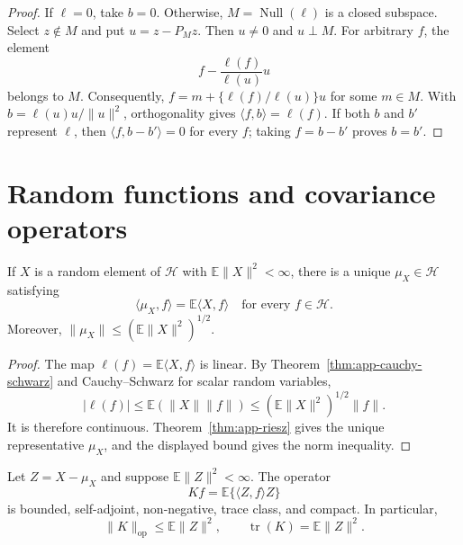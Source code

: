 \begin{proof}
If $\ell=0$, take $b=0$.  Otherwise, $M=\operatorname{Null}(\ell)$ is a
closed subspace.  Select $z\notin M$ and put $u=z-P_Mz$.  Then $u\neq0$ and
$u\perp M$.  For arbitrary $f$, the element
\[
    f-\frac{\ell(f)}{\ell(u)}u
\]
belongs to $M$.  Consequently,
$f=m+\{\ell(f)/\ell(u)\}u$ for some $m\in M$.  With
$b=\ell(u)u/\|u\|^2$, orthogonality gives
$\langle f,b\rangle=\ell(f)$.  If both $b$ and $b'$ represent $\ell$, then
$\langle f,b-b'\rangle=0$ for every $f$; taking $f=b-b'$ proves $b=b'$.
\end{proof}

\section{Random functions and covariance operators}
\label{sec:app-covariance-proofs}

\begin{proposition}
\label{prop:app-functional-mean}
If $X$ is a random element of $\mathcal H$ with
$\mathbb E\|X\|^2<\infty$, there is a unique $\mu_X\in\mathcal H$ satisfying
\[
    \langle\mu_X,f\rangle=\mathbb E\langle X,f\rangle
    \quad\text{for every }f\in\mathcal H.
\]
Moreover, $\|\mu_X\|\leq(\mathbb E\|X\|^2)^{1/2}$.
\end{proposition}

\begin{proof}
The map $\ell(f)=\mathbb E\langle X,f\rangle$ is linear.  By
Theorem~\ref{thm:app-cauchy-schwarz} and Cauchy--Schwarz for scalar random
variables,
\[
 |\ell(f)|\leq\mathbb E(\|X\|\|f\|)
 \leq(\mathbb E\|X\|^2)^{1/2}\|f\|.
\]
It is therefore continuous.  Theorem~\ref{thm:app-riesz} gives the unique
representative $\mu_X$, and the displayed bound gives the norm inequality.
\end{proof}

\begin{theorem}
\label{thm:app-covariance-properties}
Let $Z=X-\mu_X$ and suppose $\mathbb E\|Z\|^2<\infty$.  The operator
\[
    Kf=\mathbb E\{\langle Z,f\rangle Z\}
\]
is bounded, self-adjoint, non-negative, trace class, and compact.  In
particular,
\[
    \|K\|_{\mathrm{op}}\leq\mathbb E\|Z\|^2,
    \qquad
    \operatorname{tr}(K)=\mathbb E\|Z\|^2.
\]
\end{theorem}

